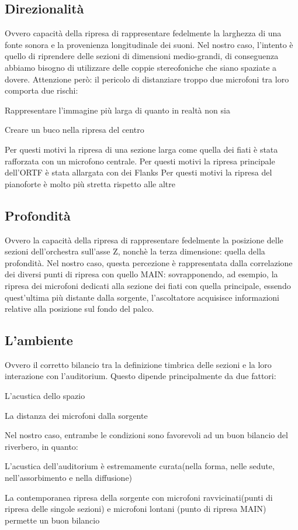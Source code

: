 \subsection*{Direzionalità}
Ovvero capacità della ripresa di rappresentare fedelmente la larghezza di una fonte sonora e la provenienza longitudinale dei suoni. Nel nostro caso, l'intento è quello di riprendere delle sezioni di dimensioni medio-grandi, di conseguenza abbiamo bisogno di utilizzare delle coppie stereofoniche che siano spaziate  a dovere. Attenzione però: il pericolo di distanziare troppo due microfoni tra loro comporta due rischi:
\begin{compactitem}
	\item Rappresentare l'immagine più larga di quanto in realtà non sia
	\item Creare un buco nella ripresa del centro
\end{compactitem}
Per questi motivi la ripresa di una sezione larga come quella dei fiati è stata rafforzata con un microfono centrale.
Per questi motivi la ripresa principale dell'ORTF è stata allargata con dei Flanks
Per questi motivi la ripresa del pianoforte è molto più stretta rispetto alle altre

\subsection*{Profondità}
Ovvero la capacità della  ripresa di rappresentare fedelmente la posizione delle sezioni dell'orchestra sull'asse Z, nonchè la terza dimensione: quella della profondità.
Nel nostro caso, questa percezione è rappresentata dalla correlazione dei diversi punti di ripresa con quello MAIN: sovrapponendo, ad esempio, la ripresa dei microfoni dedicati alla sezione dei fiati con quella principale, essendo quest'ultima più distante dalla sorgente, l'ascoltatore acquisisce informazioni relative alla posizione sul fondo del palco.

\subsection*{L'ambiente}
Ovvero il corretto bilancio tra la definizione timbrica delle sezioni e la loro interazione con l'auditorium. Questo dipende principalmente da due fattori:
\begin{compactitem}
	\item L'acustica dello spazio
	\item La distanza dei microfoni dalla sorgente
\end{compactitem}
Nel nostro caso, entrambe le condizioni sono favorevoli ad un buon bilancio del riverbero, in quanto:
\begin{compactitem}
	\item L'acustica dell'auditorium è estremamente curata(nella forma, nelle sedute, nell'assorbimento e nella diffusione)
	\item La contemporanea ripresa della sorgente con microfoni ravvicinati(punti di ripresa delle singole sezioni) e microfoni lontani (punto di ripresa MAIN) permette un buon bilancio
\end{compactitem}

